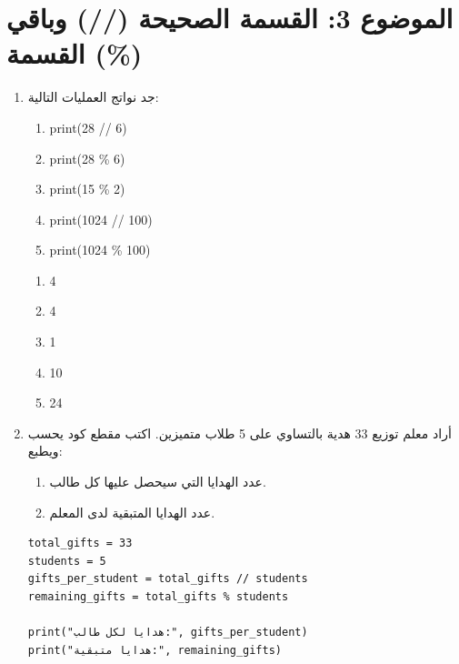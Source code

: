 \documentclass[14pt]{extarticle}
\begin{document}
\section*{الموضوع 3: القسمة الصحيحة (//) وباقي القسمة (\%)}
\begin{enumerate}[itemsep=3em]

\item
جد نواتج العمليات التالية:
\begin{enumerate}[label=\arabic*)]
    \item \textenglish{print(28 // 6)}
    \item \textenglish{print(28 \% 6)}
    \item \textenglish{print(15 \% 2)}
    \item \textenglish{print(1024 // 100)}
    \item \textenglish{print(1024 \% 100)}
\end{enumerate}

\ifwithsols
\begin{boxSolution}
\begin{enumerate}[label=\arabic*)]
    \item 4
    \item 4
    \item 1
    \item 10
    \item 24
\end{enumerate}
\end{boxSolution}
\fi

\item
أراد معلم توزيع 33 هدية بالتساوي على 5 طلاب متميزين.
اكتب مقطع كود يحسب ويطبع:
\begin{enumerate}[label=\arabic*)]
    \item عدد الهدايا التي سيحصل عليها كل طالب.
    \item عدد الهدايا المتبقية لدى المعلم.
\end{enumerate}

\ifwithsols
\begin{boxSolution}
\begin{english}
\begin{verbatim}
total_gifts = 33
students = 5
gifts_per_student = total_gifts // students
remaining_gifts = total_gifts % students

print("هدايا لكل طالب:", gifts_per_student)
print("هدايا متبقية:", remaining_gifts)
\end{verbatim}
\end{english}
\end{boxSolution}
\fi


\end{enumerate}
\end{document}
